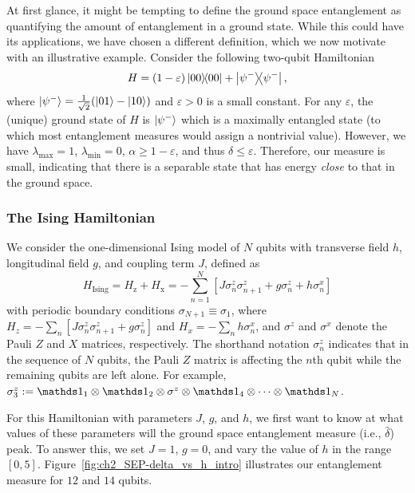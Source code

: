 At first glance, it might be tempting to define the ground space entanglement as quantifying the amount of entanglement in a ground state. 
While this could have its applications, we have chosen a different definition, which we now motivate with an illustrative example. 
Consider the following two-qubit Hamiltonian
\begin{equation}\label{eq:ch2_SEP-special_Hammy}
    H = (1 - \varepsilon) \ketbra{00}{00} + \ketbra{\psi^-}{\psi^-},
\end{equation}
where $\ket{\psi^-} = \frac{1}{\sqrt{2}}(\ket{01} - \ket{10})$ and $\varepsilon > 0$ is a small constant. 
For any $\varepsilon$, the (unique) ground state of $H$ is $\ket{\psi^-}$ which is a maximally entangled state (to which most entanglement measures would assign a nontrivial value). 
However, we have $\lambda_{\max} = 1$, $\lambda_{\min} = 0$, $\alpha \geq 1-\varepsilon$, and thus $\delta \leq \varepsilon$. 
Therefore, our measure is small, indicating that there is a separable state that has energy \emph{close} to that in the ground space.


\subsubsection{The Ising Hamiltonian} 

We consider the one-dimensional Ising model of $N$ qubits with transverse field $h$, longitudinal field $g$, and coupling term $J$, defined as
\begin{equation}
    H_{\mathrm{Ising}} = H_{\mathrm{z}} + H_{\mathrm{x}} = - \sum_{n=1}^N [J \sigma_n^z \sigma_{n+1}^z + g \sigma_n^z + h \sigma_n ^x]
\end{equation}
with periodic boundary conditions $\sigma_{N+1} \equiv \sigma_1$, where $H_z = - \sum_n [J \sigma_n^z \sigma_{n+1}^z + g \sigma_n^z]$ and $H_x = -\sum_n h \sigma_n^x$, and $\sigma^z$ and $\sigma^x$ denote the Pauli $Z$ and $X$ matrices, respectively.
The shorthand notation $\sigma_n^z$ indicates that in the sequence of $N$ qubits, the Pauli $Z$ matrix is affecting the $n$th qubit while the remaining qubits are left alone.
For example, $\sigma_3^z := \id_1 \otimes \id_2 \otimes \sigma^z \otimes \id_4 \otimes \cdots \otimes \id_N$. 

For this Hamiltonian with parameters $J$, $g$, and $h$, we first want to know at what values of these parameters will the ground space entanglement measure (i.e., $\hat{\delta}$) peak.
To answer this, we set $J = 1$, $g = 0$, and vary the value of $h$ in the range $[0, 5]$. 
Figure~\ref{fig:ch2_SEP-delta_vs_h_intro} illustrates our entanglement measure for $12$ and $14$ qubits. 

